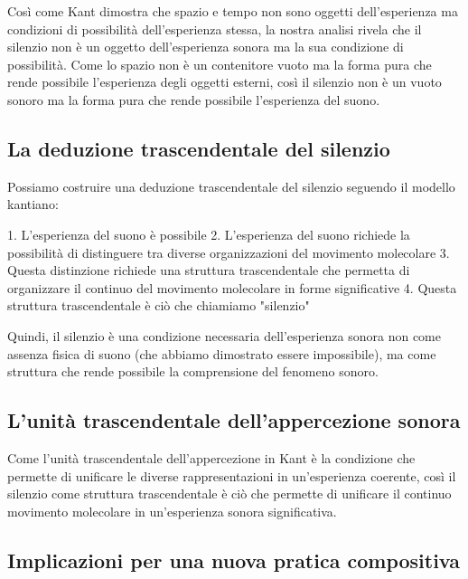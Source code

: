 \documentclass[a4paper,11pt]{article}
\begin{document}
Così come Kant dimostra che spazio e tempo non sono oggetti
dell'esperienza ma condizioni di possibilità dell'esperienza stessa, la
nostra analisi rivela che il silenzio non è un oggetto dell'esperienza
sonora ma la sua condizione di possibilità. Come lo spazio non è un
contenitore vuoto ma la forma pura che rende possibile l'esperienza
degli oggetti esterni, così il silenzio non è un vuoto sonoro ma la
forma pura che rende possibile l'esperienza del suono.

\subsection{La deduzione trascendentale del silenzio}\hypertarget{la-deduzione-trascendentale-del-silenzio}{}\label{la-deduzione-trascendentale-del-silenzio}

Possiamo costruire una deduzione trascendentale del silenzio seguendo il
modello kantiano:

1. L'esperienza del suono è possibile 2. L'esperienza del suono
richiede la possibilità di distinguere tra diverse organizzazioni del
movimento molecolare 3. Questa distinzione richiede una struttura
trascendentale che permetta di organizzare il continuo del movimento
molecolare in forme significative 4. Questa struttura trascendentale è
ciò che chiamiamo "silenzio"

Quindi, il silenzio è una condizione necessaria dell'esperienza sonora
non come assenza fisica di suono (che abbiamo dimostrato essere
impossibile), ma come struttura che rende possibile la comprensione del
fenomeno sonoro.

\subsection{L'unità trascendentale dell'appercezione sonora}\hypertarget{lunit-trascendentale-dellappercezione-sonora}{}\label{lunit-trascendentale-dellappercezione-sonora}

Come l'unità trascendentale dell'appercezione in Kant è la condizione
che permette di unificare le diverse rappresentazioni in un'esperienza
coerente, così il silenzio come struttura trascendentale è ciò che
permette di unificare il continuo movimento molecolare in un'esperienza
sonora significativa.

\subsection{Implicazioni per una nuova pratica compositiva}\hypertarget{implicazioni-per-una-nuova-pratica-compositiva}{}\label{implicazioni-per-una-nuova-pratica-compositiva}
\end{document}
